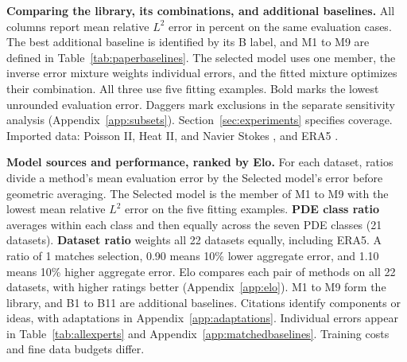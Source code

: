 \begin{table}[t]
\centering\fontsize{7}{8.5}\selectfont\setlength{\tabcolsep}{2.3pt}
\caption{\textbf{Comparing the library, its combinations, and additional baselines.}
All columns report mean relative $L^2$ error in percent on the same evaluation
cases. The best additional baseline is identified by its B label, and M1 to M9
are defined in Table~\ref{tab:paperbaselines}. The selected model uses one member,
the inverse error mixture weights individual errors, and the fitted mixture
optimizes their combination. All three use five fitting examples. Bold marks the lowest unrounded evaluation error.
Daggers mark exclusions in the separate sensitivity analysis
(Appendix~\ref{app:subsets}). Section~\ref{sec:experiments} specifies coverage.
Imported data: Poisson II, Heat II, and Navier Stokes \citep{niu2024}, and ERA5
\citep{hersbach2020,niu2024}.}
\label{tab:allexperts}
\resizebox{\linewidth}{!}{}
\end{table}

\begin{table}[t]
\centering\fontsize{7.5}{9}\selectfont\setlength{\tabcolsep}{3pt}
\caption{\textbf{Model sources and performance, ranked by Elo.}
For each dataset, ratios divide a method's mean evaluation error by the
Selected model's error before geometric averaging. The Selected model is the
member of M1 to M9 with the lowest mean relative $L^2$ error on the five fitting
examples. \textbf{PDE class ratio} averages within each class
and then equally across the seven PDE classes (21 datasets).
\textbf{Dataset ratio} weights all 22 datasets equally, including ERA5.
A ratio of 1 matches selection, 0.90 means 10\% lower aggregate error, and
1.10 means 10\% higher aggregate error. Elo compares each pair of methods on all
22 datasets, with higher ratings better (Appendix~\ref{app:elo}).
M1 to M9 form the library, and B1 to B11
are additional baselines.
Citations identify components or ideas, with adaptations in
Appendix~\ref{app:adaptations}. Individual errors appear in
Table~\ref{tab:allexperts} and Appendix~\ref{app:matchedbaselines}.
Training costs and fine data budgets differ.}
\label{tab:paperbaselines}
\resizebox{\linewidth}{!}{}
\end{table}
